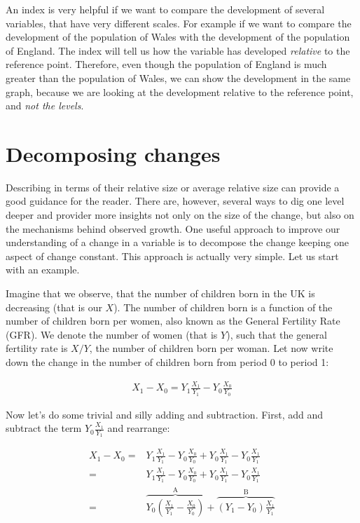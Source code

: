 \documentclass[]{book}
\begin{document}
An index is very helpful if we want to compare the development of several variables, that have very different scales. For example if we want to compare the development of the population of Wales with the development of the population of England. The index will tell us how the variable has developed \emph{relative} to the reference point. Therefore, even though the population of England is much greater than the population of Wales, we can show the development in the same graph, because we are looking at the development relative to the reference point, and \emph{not the levels}.

\hypertarget{decomposing-changes}{%
\section{Decomposing changes}\label{decomposing-changes}}

Describing in terms of their relative size or average relative size can provide a good guidance for the reader. There are, however, several ways to dig one level deeper and provider more insights not only on the size of the change, but also on the mechanisms behind observed growth. One useful approach to improve our understanding of a change in a variable is to decompose the change keeping one aspect of change constant. This approach is actually very simple. Let us start with an example.

Imagine that we observe, that the number of children born in the UK is decreasing (that is our \(X\)). The number of children born is a function of the number of children born per women, also known as the General Fertility Rate (GFR). We denote the number of women (that is \(Y\)), such that the general fertility rate is \(X/Y\), the number of children born per woman. Let now write down the change in the number of children born from period 0 to period 1:

\begin{align}
   X_1-X_0=Y_1\frac{X_1}{Y_1}-Y_0\frac{X_0}{Y_0}
 \end{align}

Now let's do some trivial and silly adding and subtraction. First, add and subtract the term \(Y_0\frac{X_1}{Y_1}\) and rearrange:

\begin{align}
   X_1-X_0=&Y_1\frac{X_1}{Y_1}-Y_0\frac{X_0}{Y_0}+Y_0\frac{X_1}{Y_1}-Y_0\frac{X_1}{Y_1}\nonumber\\
        =&Y_1\frac{X_1}{Y_1}-Y_0\frac{X_0}{Y_0}+Y_0\frac{X_1}{Y_1}-Y_0\frac{X_1}{Y_1}\nonumber\\
        =&\overbrace{Y_0\left(\frac{X_1}{Y_1}-\frac{X_0}{Y_0}\right)}^{\text{A}}+\overbrace{(Y_1-Y_0)\frac{X_1}{Y_1}}^{\text{B}}\nonumber
\end{align}
\end{document}
